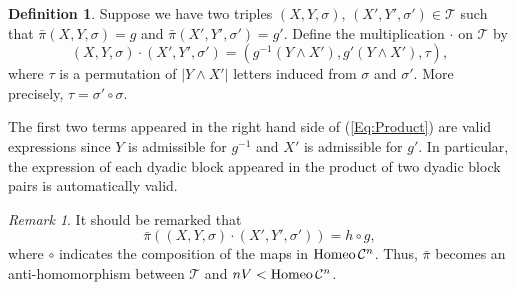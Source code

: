 \documentclass[12pt,reqno]{amsart}
\theoremstyle{plain}
\theoremstyle{definition}
\newtheorem{definition}{Definition}[section]
\theoremstyle{remark}
\newtheorem{remark}{Remark}[section]
\numberwithin{equation}{section}
\begin{document}
\begin{definition} 
	Suppose we have two triples  
	$(X, Y, \sigma), \, (X', Y', \sigma') \in \mathcal{T}$  such that  
	$\bar{\pi} (X, Y, \sigma) = g$  and  $\bar{\pi} (X', Y', \sigma') = g'$. 
	Define the multiplication  $\cdot$  on  $\mathcal{T}$
	by 
	\begin{equation}\label{Eq:Product} 
		  (X, Y, \sigma) \cdot (X', Y', \sigma') 
		  = (g^{-1} (Y \wedge X'), g'(Y \wedge X'), \tau),   
	\end{equation} 
	where  $\tau$  is a permutation of  $|Y \wedge X'|$  letters 
	induced from  $\sigma$  and  $\sigma'$.  
	More precisely, $\tau = \sigma' \circ \sigma$.
\end{definition} 

The first two terms  
appeared in the right hand side of  (\ref{Eq:Product})  are valid expressions  
since  $Y$  is admissible for  $g^{-1}$  and  $X'$  is admissible for  $g'$.  
In particular, 
the expression of each dyadic block appeared in the product of two dyadic block pairs 
is automatically valid.     


\begin{remark}  
	It should be remarked that  
	\begin{equation*} 
		\bar{\pi}((X, Y, \sigma) \cdot (X', Y', \sigma')) = h \circ g,  
	\end{equation*}  
	where  $\circ$  indicates the composition of the maps in  ${\rm Homeo} \, \mathcal{C}^n$.  
	Thus,  
	$\bar{\pi}$  becomes an anti-homomorphism between  
	$\mathcal{T}$  and  $nV < {\rm Homeo} \, \mathcal{C}^n$.
\end{remark} 
\end{document}
